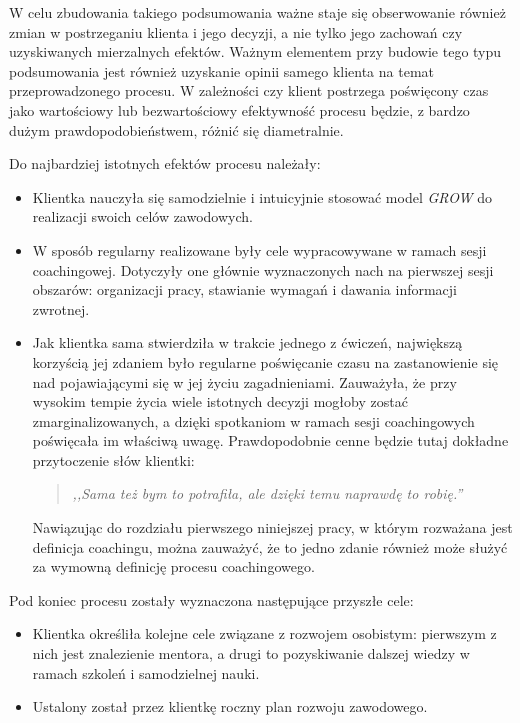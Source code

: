 W celu zbudowania takiego podsumowania ważne staje się obserwowanie również zmian w postrzeganiu klienta i jego decyzji, a nie tylko jego zachowań
czy uzyskiwanych mierzalnych efektów. Ważnym elementem przy budowie tego typu podsumowania jest również uzyskanie opinii samego klienta na temat
przeprowadzonego procesu. W zależności czy klient postrzega poświęcony czas jako wartościowy lub bezwartościowy efektywność procesu będzie,
z bardzo dużym prawdopodobieństwem, różnić się diametralnie.

Do najbardziej istotnych efektów procesu należały:
\begin{itemize}
  \item Klientka nauczyła się samodzielnie i intuicyjnie stosować model \emph{GROW} do realizacji swoich celów zawodowych.
  \item W sposób regularny realizowane były cele wypracowywane w ramach sesji coachingowej. Dotyczyły one głównie wyznaczonych nach na
      pierwszej sesji obszarów: organizacji pracy, stawianie wymagań i dawania informacji zwrotnej.
  \item Jak klientka sama stwierdziła w trakcie jednego z ćwiczeń, największą korzyścią jej zdaniem było regularne poświęcanie czasu na zastanowienie
      się nad pojawiającymi się w jej życiu zagadnieniami. Zauważyła, że przy wysokim tempie życia wiele istotnych decyzji mogłoby zostać zmarginalizowanych,
      a dzięki spotkaniom w ramach sesji coachingowych poświęcała im właściwą uwagę. Prawdopodobnie cenne będzie tutaj dokładne przytoczenie słów klientki:
      \begin{quote}
      \centering
      \emph{,,Sama też bym to potrafiła, ale dzięki temu naprawdę to robię.''}
      \end{quote}
      Nawiązując do rozdziału pierwszego niniejszej pracy, w którym rozważana jest definicja coachingu, można zauważyć, że to jedno zdanie również
      może służyć za wymowną definicję procesu coachingowego.
\end{itemize}

Pod koniec procesu zostały wyznaczona następujące przyszłe cele:
\begin{itemize}
  \item Klientka określiła kolejne cele związane z rozwojem osobistym: pierwszym z nich jest znalezienie mentora, a drugi to pozyskiwanie dalszej wiedzy
      w ramach szkoleń i samodzielnej nauki.
  \item Ustalony został przez klientkę roczny plan rozwoju zawodowego.
\end{itemize}

